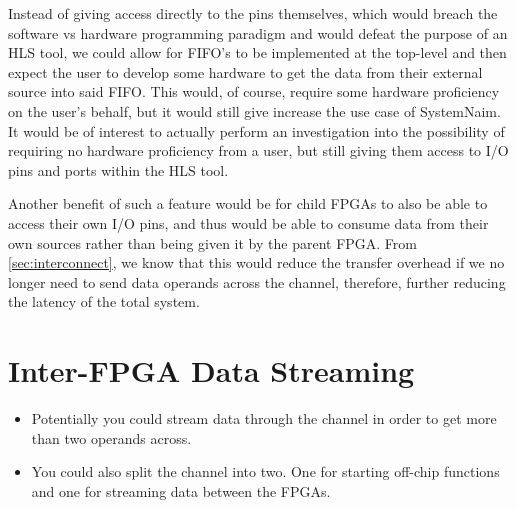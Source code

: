 Instead of giving access directly to the pins themselves, which would breach the software vs hardware programming paradigm and would defeat the purpose of an HLS tool, we could allow for FIFO's to be implemented at the top-level and then expect the user to develop some hardware to get the data from their external source into said FIFO. This would, of course, require some hardware proficiency on the user's behalf, but it would still give increase the use case of SystemNaim. It would be of interest to actually perform an investigation into the possibility of requiring no hardware proficiency from a user, but still giving them access to I/O pins and ports within the HLS tool.

Another benefit of such a feature would be for child FPGAs to also be able to access their own I/O pins, and thus would be able to consume data from their own sources rather than being given it by the parent FPGA. From \autoref{sec:interconnect}, we know that this would reduce the transfer overhead if we no longer need to send data operands across the channel, therefore, further reducing the latency of the total system.

\section{Inter-FPGA Data Streaming}

\begin{itemize}
    \item Potentially you could stream data through the channel in order to get more than two operands across.
    \item You could also split the channel into two. One for starting off-chip functions and one for streaming data between the FPGAs.
\end{itemize}
